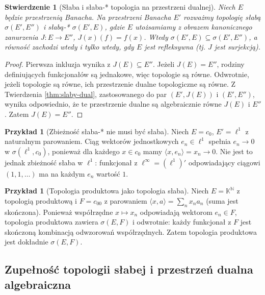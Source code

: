 \documentclass[11pt,a4paper]{article}
\numberwithin{equation}{section}
\theoremstyle{plain}
\newtheorem{stwierdzenie}[twierdzenie]{Stwierdzenie}
\theoremstyle{definition}
\newtheorem{przyklad}[twierdzenie]{Przykład}
\theoremstyle{remark}
\newcommand{\N}{\mathbb N}
\newcommand{\K}{\mathbb K}
\begin{document}
\begin{stwierdzenie}[Słaba i słaba-* topologia na przestrzeni dualnej]
\label{prop:slaba-weakstar}
Niech $E$ będzie przestrzenią Banacha. Na przestrzeni
Banacha $E'$ rozważmy topologię słabą
$\sigma(E',E'')$ i słabą-* $\sigma(E',E)$,
gdzie $E$ utożsamiamy z obrazem kanonicznego zanurzenia
$J:E\to E''$, $J(x)(f)=f(x)$.
Wtedy $\sigma(E',E)\subseteq\sigma(E',E'')$,
a równość zachodzi wtedy i tylko wtedy, gdy $E$ jest
refleksywna (tj. $J$ jest surjekcją).
\end{stwierdzenie}
\begin{proof}
Pierwsza inkluzja wynika z $J(E)\subseteq E''$.
Jeżeli $J(E)=E''$, rodziny definiujących funkcjonałów
są jednakowe, więc topologie są równe.
Odwrotnie, jeżeli topologie są równe, ich przestrzenie
dualne topologiczne są równe. Z Twierdzenia
\ref{thm:slaby-dual}, zastosowanego do par
$(E',J(E))$ i $(E',E'')$, wynika odpowiednio,
że te przestrzenie dualne są algebraicznie równe
$J(E)$ i $E''$. Zatem $J(E)=E''$.
\end{proof}

\begin{przyklad}[Zbieżność słaba-* nie musi być słaba]
Niech $E=c_0$, $E'=\ell^1$ z naturalnym parowaniem.
Ciąg wektorów jednostkowych $e_n\in\ell^1$ spełnia
$e_n\to0$ w $\sigma(\ell^1,c_0)$, ponieważ dla każdego
$x\in c_0$ mamy $\langle x,e_n\rangle=x_n\to0$.
Nie jest to jednak zbieżność słaba w $\ell^1$:
funkcjonał z $\ell^\infty=(\ell^1)'$ odpowiadający
ciągowi $(1,1,\ldots)$ ma na każdym $e_n$ wartość $1$.
\end{przyklad}

\begin{przyklad}[Topologia produktowa jako topologia słaba]
Niech $E=\K^{\N}$ z topologią produktową i $F=c_{00}$
z parowaniem $\langle x,a\rangle=\sum_n x_na_n$
(suma jest skończona). Ponieważ współrzędne
$x\mapsto x_n$ odpowiadają wektorom $e_n\in F$,
topologia produktowa zawiera $\sigma(E,F)$ i odwrotnie:
każdy funkcjonał z $F$ jest skończoną kombinacją
odwzorowań współrzędnych. Zatem topologia produktowa
jest dokładnie $\sigma(E,F)$.
\end{przyklad}

\subsection{Zupełność topologii słabej i przestrzeń dualna algebraiczna}
\end{document}
